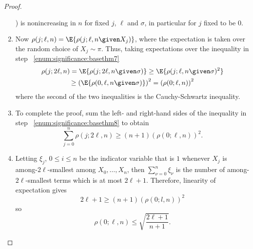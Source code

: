 \documentclass[12pt]{article}
\begin{document}
\begin{proof}
\begin{enumerate}
            \sigma) \) is nonincreasing in \( n \) for fixed \( j \), \(
            \ell \) and \( \sigma \), in particular for \( j \) fixed to
            be \( 0 \).
        \item
            \label{enum:significance:basethm8} Now \( \rho(j;\ell,n) =
            \E{\rho(j; \ell, n \given X_j)} \), where the expectation is
            taken over the random choice of \( X_j \sim \pi \).  Thus,
            taking expectations over the inequality in step~%
            \ref{enum:significance:basethm7}
            \begin{multline}
                \rho(j; 2\ell, n) = \E{\rho(j; 2\ell, n \given \sigma)}
                \ge \E{\rho(j; \ell, n \given \sigma)^2} \\
                \ge \left( \E{\rho(0, \ell, n \given \sigma)}\right)^2 =
                \left( \rho(0; \ell, n) \right)^2
            \end{multline}
            where the second of the two inequalities is the
            Cauchy-Schwartz inequality.
        \item
            To complete the proof, sum the left- and right-hand sides of
            the inequality in step~%
            \ref{enum:significance:basethm8} to obtain
            \[
                \sum\limits_{j=0}^n \rho(j; 2\ell, n) \ge (n+1) (\rho(0;
                \ell, n))^2.
            \]
        \item
            Letting \( \xi_j \), \( 0 \le i \le n \) be the indicator
            variable that is \( 1 \) whenever \( X_j \) is among-\( 2\ell
            \)-smallest among \( X_0, \dots , X_n \), then \( \sum_{\nu=0}^n
            \xi_{\nu} \) is the number of among-\( 2\ell \)-smallest
            terms which is at most \( 2\ell + 1 \).  Therefore,
            linearity of expectation gives
            \[
                2\ell + 1 \ge (n + 1)(\rho(0; l,n) )^2
            \] so
            \[
                \rho(0; \ell, n) \le \sqrt{ \frac{2\ell + 1}{n+1}}.
            \]
    \end{enumerate}
\end{proof}
\end{document}
